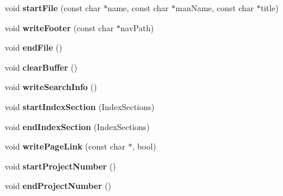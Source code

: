 \begin{DoxyCompactItemize}
\item 
\hypertarget{class_html_generator_a642331f37add1aa818a86124a5fe4723}{void {\bfseries start\-File} (const char $\ast$name, const char $\ast$man\-Name, const char $\ast$title)}\label{class_html_generator_a642331f37add1aa818a86124a5fe4723}

\item 
\hypertarget{class_html_generator_a7a5851ef00c52f6045b3175cfbcb76d2}{void {\bfseries write\-Footer} (const char $\ast$nav\-Path)}\label{class_html_generator_a7a5851ef00c52f6045b3175cfbcb76d2}

\item 
\hypertarget{class_html_generator_a91124168a972dfb54e63eb80980bd7c4}{void {\bfseries end\-File} ()}\label{class_html_generator_a91124168a972dfb54e63eb80980bd7c4}

\item 
\hypertarget{class_html_generator_a20bbd4d45e3f01305dd709f5a9cc9952}{void {\bfseries clear\-Buffer} ()}\label{class_html_generator_a20bbd4d45e3f01305dd709f5a9cc9952}

\item 
\hypertarget{class_html_generator_ac9f113172cc5a97370c617e213bcef3d}{void {\bfseries write\-Search\-Info} ()}\label{class_html_generator_ac9f113172cc5a97370c617e213bcef3d}

\item 
\hypertarget{class_html_generator_a0ba12f00bd57920ac19800f88c278225}{void {\bfseries start\-Index\-Section} (Index\-Sections)}\label{class_html_generator_a0ba12f00bd57920ac19800f88c278225}

\item 
\hypertarget{class_html_generator_aae16fa3289b7840fb25c82a4879d72b6}{void {\bfseries end\-Index\-Section} (Index\-Sections)}\label{class_html_generator_aae16fa3289b7840fb25c82a4879d72b6}

\item 
\hypertarget{class_html_generator_a22ca64ac305373bb358d6ef3d6bfde5e}{void {\bfseries write\-Page\-Link} (const char $\ast$, bool)}\label{class_html_generator_a22ca64ac305373bb358d6ef3d6bfde5e}

\item 
\hypertarget{class_html_generator_ab49b9a957bcd7cdd43e97cf46ee3fd5b}{void {\bfseries start\-Project\-Number} ()}\label{class_html_generator_ab49b9a957bcd7cdd43e97cf46ee3fd5b}

\item 
\hypertarget{class_html_generator_adb778208eb7fefd771008cfeab951888}{void {\bfseries end\-Project\-Number} ()}\label{class_html_generator_adb778208eb7fefd771008cfeab951888}


\end{DoxyCompactItemize}
